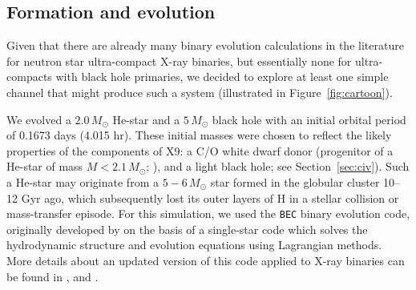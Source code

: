 \documentclass[a4paper,fleqn,usenatbib]{mnras}
\begin{document}
\subsection{Formation and evolution}
\label{sec:simul}

Given that there are already many binary evolution calculations in the literature for neutron star ultra-compact X-ray binaries, but essentially none for ultra-compacts with black hole primaries, we decided to explore at least one simple channel that might produce such a system (illustrated in Figure~\ref{fig:cartoon}). 

We evolved a $2.0\,M_\odot$ He-star and a $5\,M_\odot$ black hole with an initial orbital period of 0.1673 days (4.015 hr). These initial masses were chosen to reflect the likely properties of the components of X9: a C/O white dwarf donor (progenitor of a He-star of mass $M < 2.1\,M_\odot$; \citealp{2002MNRAS.331.1027D}), and a light black hole; see Section~\ref{sec:civ}). Such a He-star may originate from a $5-6\,M_\odot$ star formed in the globular cluster 10--12 Gyr ago, which subsequently lost its outer layers of H in a stellar collision or mass-transfer episode. For this simulation, we used the {\tt BEC} binary evolution code, originally developed by \citet{1997PhDT........55B} on the basis of a single-star code \citep{1998A&A...329..551L} which solves the hydrodynamic structure and evolution equations \citep{1990sse..book.....K} using Lagrangian methods. More details about an updated version of this code applied to X-ray binaries can be found in \citet{2012MNRAS.425.1601T}, \citet{2014A&A...571A..45I} and \citet{2015MNRAS.451.2123T}. 
\end{document}
